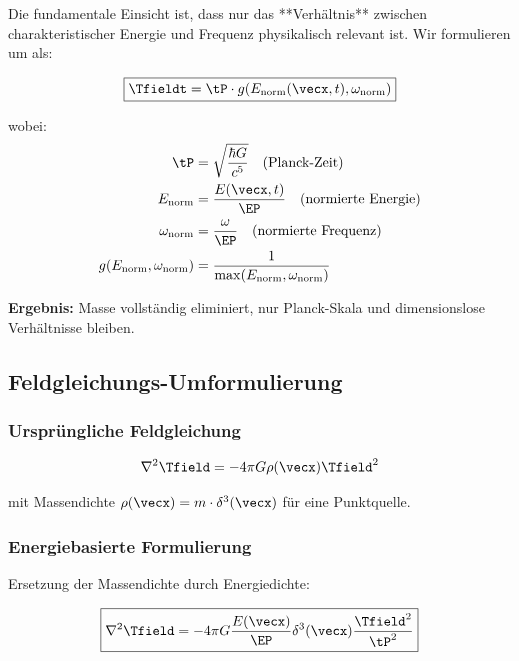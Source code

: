 	Die fundamentale Einsicht ist, dass nur das **Verhältnis** zwischen charakteristischer Energie und Frequenz physikalisch relevant ist. Wir formulieren um als:
	
	\begin{equation}
		\boxed{\Tfieldt = \tP \cdot g(E_{\text{norm}}(\vecx,t), \omega_{\text{norm}})}
		\label{eq:time_field_mass_free}
	\end{equation}
	
	wobei:
	\begin{align}
		\tP &= \sqrt{\frac{\hbar G}{c^5}} \quad \text{(Planck-Zeit)} \\
		E_{\text{norm}} &= \frac{E(\vecx,t)}{\EP} \quad \text{(normierte Energie)} \\
		\omega_{\text{norm}} &= \frac{\omega}{\EP} \quad \text{(normierte Frequenz)} \\
		g(E_{\text{norm}}, \omega_{\text{norm}}) &= \frac{1}{\max(E_{\text{norm}}, \omega_{\text{norm}})}
	\end{align}
	
	\textbf{Ergebnis:} Masse vollständig eliminiert, nur Planck-Skala und dimensionslose Verhältnisse bleiben.
	
	\subsection{Feldgleichungs-Umformulierung}
	\label{subsec:field_equation_elimination}
	
	\subsubsection{Ursprüngliche Feldgleichung}
	
	\begin{equation}
		\nabla^2 \Tfield = -4\pi G \rho(\vecx) \Tfield^2
		\label{eq:field_equation_original}
	\end{equation}
	
	mit Massendichte $\rho(\vecx) = m \cdot \delta^3(\vecx)$ für eine Punktquelle.
	
	\subsubsection{Energiebasierte Formulierung}
	
	Ersetzung der Massendichte durch Energiedichte:
	
	\begin{equation}
		\boxed{\nabla^2 \Tfield = -4\pi G \frac{E(\vecx)}{\EP} \delta^3(\vecx) \frac{\Tfield^2}{\tP^2}}
		\label{eq:field_equation_mass_free}
	\end{equation}
	

